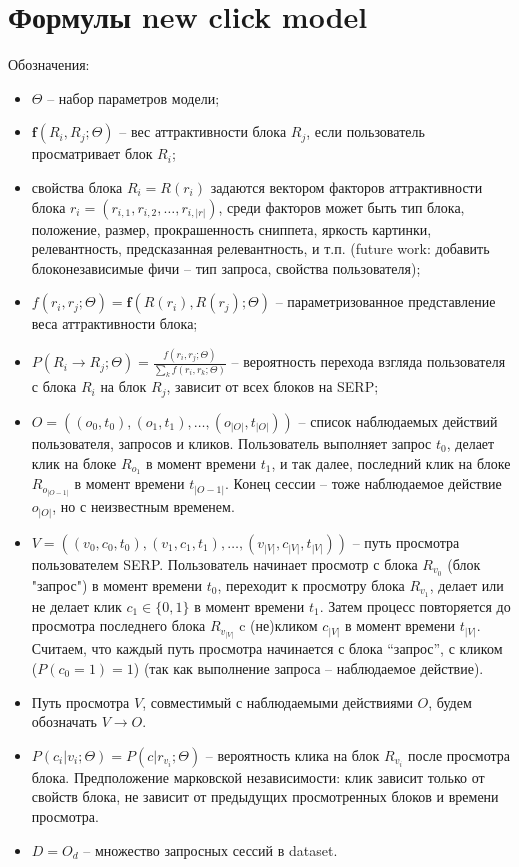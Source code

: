 \documentclass[12pt,a4paper]{article}
\begin{document}
\section{Формулы new click model}

Обозначения:
\begin{itemize}
 \item $\Theta$ -- набор параметров модели;
 \item $\mathbf{f}(R_i, R_j; \Theta)$ -- вес аттрактивности блока $R_j$, если пользователь просматривает блок $R_i$;
 \item свойства блока $R_i=R(r_i)$ задаются вектором факторов аттрактивности блока $r_i=(r_{i,1}, r_{i,2}, \ldots, r_{i,|r|})$, среди факторов может быть тип блока, положение, размер, прокрашенность сниппета, яркость картинки, релевантность, предсказанная релевантность, и т.п. (future work: добавить блоконезависимые фичи -- тип запроса, свойства пользователя);
 \item $f(r_i, r_j; \Theta) = \mathbf{f}(R(r_i), R(r_j); \Theta)$ -- параметризованное представление веса аттрактивности блока;
 \item $P(R_i \to R_j; \Theta) = \frac{f(r_i, r_j; \Theta)}{\sum_k f(r_i, r_k; \Theta)}$ -- вероятность перехода взгляда пользователя с блока $R_i$ на блок $R_j$, зависит от всех блоков на SERP;

 \item $O = \left((o_0, t_0), (o_1, t_1), \ldots, (o_{|O|}, t_{|O|})\right)$ -- список наблюдаемых действий пользователя, запросов и кликов. Пользователь выполняет запрос $t_0$, делает клик на блоке $R_{o_1}$ в момент времени $t_1$, и так далее, последний клик на блоке $R_{o_{|O-1|}}$ в момент времени $t_{|O-1|}$. Конец сессии -- тоже наблюдаемое действие $o_{|O|}$, но с неизвестным временем.

 \item $V = \left((v_0, c_0, t_0), (v_1, c_1, t_1), \ldots, (v_{|V|}, c_{|V|}, t_{|V|})\right)$ -- путь просмотра пользователем SERP. Пользователь начинает просмотр с блока $R_{v_0}$ (блок "запрос") в момент времени $t_0$, переходит к просмотру блока $R_{v_1}$, делает или не делает клик $c_1 \in \{0,1\}$ в момент времени $t_1$. Затем процесс повторяется до просмотра последнего блока $R_{v_{|V|}}$ c (не)кликом $c_{|V|}$ в момент времени $t_{|V|}$. Считаем, что каждый путь просмотра начинается с блока ``запрос'', с кликом ($P(c_0=1)=1$) (так как выполнение запроса -- наблюдаемое действие).

 \item Путь просмотра $V$, совместимый с наблюдаемыми действиями $O$, будем обозначать $V \to O$.

 \item $P(c_i | v_i; \Theta) = P(c | r_{v_i}; \Theta)$ -- вероятность клика на блок $R_{v_i}$ после просмотра блока. Предположение марковской независимости: клик зависит только от свойств блока, не зависит от предыдущих просмотренных блоков и времени просмотра.

 \item $D={O_d}$ -- множество запросных сессий в dataset.

\end{itemize}
\end{document}
